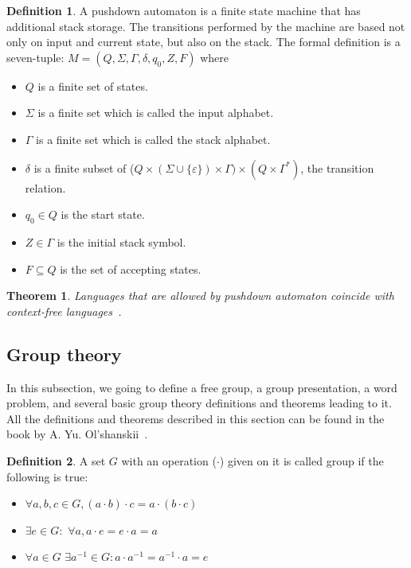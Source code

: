 \documentclass[conference]{IEEEtran}
\newtheorem{thm}{Theorem}[section]
\theoremstyle{definition}
\newtheorem{defn}{Definition}[section]
\begin{document}
\begin{defn}
A pushdown automaton is a finite state machine that has additional stack storage. The transitions performed by the machine are based not only on input and current state, but also on the stack. The formal definition is a seven-tuple:
$M=(Q,\Sigma ,\Gamma ,\delta ,q_{0},Z,F)$ where
\begin{itemize}
    \item $Q$ is a finite set of states.
    \item $\Sigma$ is a finite set which is called the input alphabet.
    \item $\Gamma$ is a finite set which is called the stack alphabet.
    \item $\delta$ is a finite subset of ($Q \times (\Sigma \cup \{\varepsilon \})\times \Gamma) \times (Q\times \Gamma^{*})$, the transition relation.
    \item $q_{0}\in Q$ is the start state.
    \item $Z\in \Gamma$ is the initial stack symbol.
    \item $F\subseteq Q$ is the set of accepting states.
\end{itemize}
\end{defn}

\begin{thm} \label{thmpda}
Languages that are allowed by pushdown automaton coincide with context-free languages~\cite{hopcroft2013introduction}.
\end{thm}

\subsection{Group theory}

In this subsection, we going to define a free group, a group presentation,
a word problem, and several basic group theory definitions and theorems leading to it.
All the definitions and theorems described in this section can be found in the book by A. Yu. Ol'shanskii~\cite{ol2012geometry}.

\begin{defn}
A set $G$ with an operation ($\cdot$) given on it is called group if the following is true:
\begin{itemize}
\item $\forall a, b, c \in G, (a \cdot b) \cdot c = a \cdot (b \cdot c)$
\item $\exists e \in G :$ $\forall a, a \cdot e = e \cdot a = a$
\item $\forall a \in G$ $\exists a^{-1} \in G :  a \cdot a^{-1} = a^{-1} \cdot a = e$
\end{itemize}
\end{defn}
\end{document}
